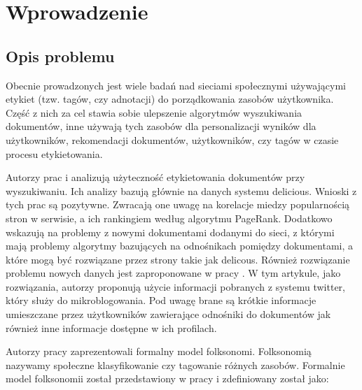 





%
\chapter{Wprowadzenie}

\section{Opis problemu}
Obecnie prowadzonych jest wiele badań nad sieciami społecznymi używającymi etykiet (tzw. tagów, czy adnotacji) do porządkowania zasobów użytkownika. Część z nich za cel stawia sobie ulepszenie algorytmów wyszukiwania dokumentów, inne używają tych zasobów dla personalizacji wyników dla użytkowników, rekomendacji dokumentów, użytkowników, czy tagów w czasie procesu etykietowania.

Autorzy prac \cite{yanbe2007} i \cite{citeulike:3423869} analizują użyteczność etykietowania dokumentów przy wyszukiwaniu. Ich analizy bazują głównie na danych systemu delicious. Wnioski z tych prac są pozytywne. Zwracają one uwagę na korelacje miedzy popularnością stron w serwisie, a ich rankingiem według algorytmu PageRank. Dodatkowo wskazują na problemy z nowymi dokumentami dodanymi do sieci, z którymi mają problemy algorytmy bazujących na odnośnikach pomiędzy dokumentami, a które mogą być rozwiązane przez strony takie jak delicous. Również rozwiązanie problemu nowych danych jest zaproponowane w pracy \cite{citeulike:8024203}. W tym artykule, jako rozwiązania, autorzy proponują użycie informacji pobranych z systemu twitter, który służy do mikroblogowania. Pod uwagę brane są krótkie informacje umieszczane przez użytkowników zawierające odnośniki do dokumentów jak również inne informacje dostępne w ich profilach.


Autorzy pracy  zaprezentowali formalny model folksonomi. Folksonomią nazywamy społeczne klasyfikowanie czy tagowanie różnych zasobów. Formalnie model folksonomii został przedstawiony w pracy \cite{hotho2006information} i zdefiniowany został jako: 

